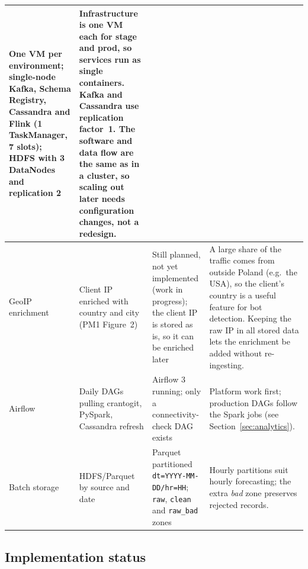 \documentclass[11pt,a4paper]{article}
\begin{document}
{\begin{longtable}{@{}L{1.8cm}L{2.3cm}L{4.3cm}L{6.3cm}@{}}
  One VM per environment; single-node Kafka, Schema Registry, Cassandra and Flink (1 TaskManager, 7 slots); HDFS with 3 DataNodes and replication 2 &
  Infrastructure is one VM each for stage and prod, so services run as single containers. Kafka and Cassandra use replication factor~1.
  The software and data flow are the same as in a cluster, so scaling out later needs configuration changes, not a redesign. \\
\midrule[0.3pt]
GeoIP enrichment &
  Client IP enriched with country and city (PM1 Figure~2) &
  Still planned, not yet implemented (work in progress); the client IP is stored as is, so it can be enriched later &
  A large share of the traffic comes from outside Poland (e.g.\ the USA), so the client's country is a useful feature for bot detection.
  Keeping the raw IP in all stored data lets the enrichment be added without re-ingesting. \\
\midrule[0.3pt]
Airflow &
  Daily DAGs pulling crantogit, PySpark, Cassandra refresh &
  Airflow 3 running; only a connectivity-check DAG exists &
  Platform work first; production DAGs follow the Spark jobs (see Section~\ref{sec:analytics}). \\
\midrule[0.3pt]
Batch storage &
  HDFS/Parquet by source and date &
  Parquet partitioned \texttt{dt=YYYY-MM-DD/hr=HH}; \texttt{raw}, \texttt{clean} and \texttt{raw\_\allowbreak{}bad} zones &
  Hourly partitions suit hourly forecasting; the extra \emph{bad} zone preserves rejected records. \\
\end{longtable}}

\subsection{Implementation status}
\end{document}
